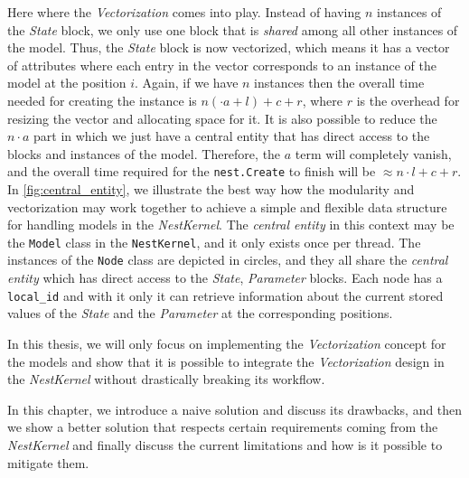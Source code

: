 Here where the \emph{Vectorization} comes into play. Instead of having $n$ instances of the \emph{State} block, we only use one block that is \emph{shared} among all other instances of the model. Thus, the \emph{State} block is now vectorized, which means it has a vector of attributes where each entry in the vector corresponds to an instance of the model at the position $i$. Again, if we have $n$ instances then the overall time needed for creating the instance is $n (\cdot a + l) + c + r $, where $r$ is the overhead for resizing the vector and allocating space for it. It is also possible to reduce the $n \cdot a$ part in which we just have a central entity that has direct access to the blocks and instances of the model. Therefore, the $a$ term will completely vanish, and the overall time required for the \texttt{nest.Create} to finish will be  $ \approx n \cdot l + c + r $. In \autoref{fig:central_entity}, we illustrate the best way how the modularity and vectorization may work together to achieve a simple and flexible data structure for handling models in the \emph{NestKernel}. The \emph{central entity} in this context may be the \texttt{Model} class in the \texttt{NestKernel}, and it only exists once per thread. The instances of the \texttt{Node} class are depicted in circles, and they all share the \emph{central entity} which has direct access to the \emph{State}, \emph{Parameter} blocks. Each node has a \texttt{local\_id} and with it only it can retrieve information about the current stored values of the \emph{State} and the \emph{Parameter} at the corresponding positions.
 
In this thesis, we will only focus on implementing the \emph{Vectorization} concept for the models and show that it is possible to integrate the \emph{Vectorization} design in the \emph{NestKernel} without drastically breaking its workflow.

In this chapter, we introduce a naive solution and discuss its drawbacks, and then we show a better solution that respects certain requirements coming from the \emph{NestKernel} and finally discuss the current limitations and how is it possible to mitigate them.
 
